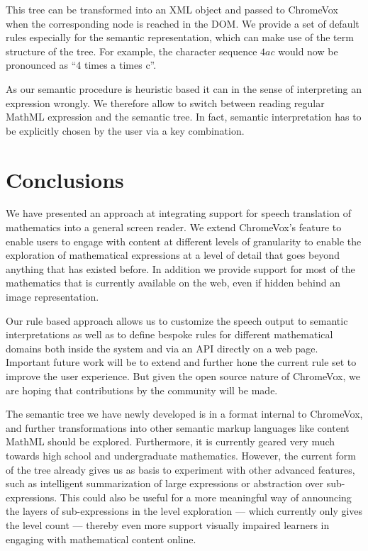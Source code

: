 \documentclass{sig-alternate}
\begin{document}
This tree can be transformed into an XML object and passed to ChromeVox when the
corresponding node is reached in the DOM. We provide a set of default rules
especially for the semantic representation, which can make use of the term
structure of the tree. For example, the character sequence $4ac$ would now be
pronounced as ``4 times a times c''.

As our semantic procedure is heuristic based it can in the sense of interpreting
an expression wrongly. We therefore allow to switch between reading regular
MathML expression and the semantic tree. In fact, semantic interpretation has to
be explicitly chosen by the user via a key combination.

\section{Conclusions}
\label{sec:conc}

We have presented an approach at integrating support for speech translation of
mathematics into a general screen reader. We extend ChromeVox's feature to
enable users to engage with content at different levels of granularity to enable
the exploration of mathematical expressions at a level of detail that goes
beyond anything that has existed before. In addition we provide support for most
of the mathematics that is currently available on the web, even if hidden behind
an image representation.

Our rule based approach allows us to customize the speech output to semantic
interpretations as well as to define bespoke rules for different mathematical
domains both inside the system and via an API directly on a web page.  Important
future work will be to extend and further hone the current rule set to improve
the user experience.  But given the open source nature of ChromeVox, we are
hoping that contributions by the community will be made.

The semantic tree we have newly developed is in a format internal to ChromeVox,
and further transformations into other semantic markup languages like content
MathML should be explored. Furthermore, it is currently geared very much towards
high school and undergraduate mathematics.  However, the current form of the
tree already gives us as basis to experiment with other advanced features, such
as intelligent summarization of large expressions or abstraction over
sub-expressions. This could also be useful for a more meaningful way of
announcing the layers of sub-expressions in the level exploration --- which
currently only gives the level count --- thereby even more support visually
impaired learners in engaging with mathematical content online.
\end{document}
